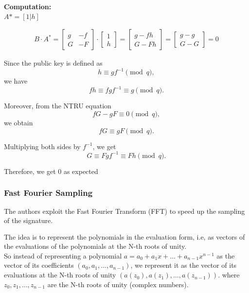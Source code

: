 \noindent
\textbf{Computation:}\\
$A* = [1 | h]$

\begin{align*}
    B \cdot A^* = \left[ \begin{array}{c|c}
        g & -f \\
        \hline
        G & -F
    \end{array} \right] \cdot \left[ \begin{array}{c}
        1 \\
        \hline
        h
    \end{array} \right] =  \left[ \begin{array}{c}
        g - f h \\
        \hline
        G - F h
    \end{array} \right] =  \left[ \begin{array}{c}
        g - g \\
        \hline
        G - G
    \end{array} \right] = 0
\end{align*}    

\noindent
Since the public key is defined as
\[
h \equiv g f^{-1} \pmod q,
\]
we have
\[
fh \equiv f g f^{-1} \equiv g \pmod q.
\]

\noindent
Moreover, from the NTRU equation
\[
fG-gF \equiv 0 \pmod q,
\]
we obtain
\[
fG \equiv gF \pmod q.
\]

\noindent
Multiplying both sides by \(f^{-1}\), we get
\[
G \equiv Fgf^{-1} \equiv Fh \pmod q.
\]

\noindent
Therefore, we get 0 as expected

\subsubsection{Fast Fourier Sampling}
The authors exploit the Fast Fourier Transform (FFT) to speed up the sampling of the signature.
\medskip

\noindent
The idea is to represent the polynomials in the evaluation form, i.e, as vectors of the evaluations of the polynomials at the N-th roots of unity.\\
So instead of representing a polynomial $a = a_0 + a_1 x + \ldots + a_{n-1} x^{n-1}$ as the vector of its coefficients $(a_0, a_1, \ldots, a_{n-1})$, we represent it as the vector of its evaluations at the N-th roots of unity $(a(z_0), a(z_1), \ldots, a(z_{n-1}))$. where $z_0, z_1, \ldots, z_{n-1}$ are the N-th roots of unity (complex numbers).


